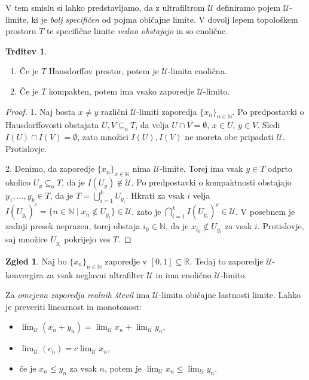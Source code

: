 \documentclass[11pt]{book}
\def\NN{\mathbb{N}}
\def\RR{\mathbb{R}}
\def\UU{\mathcal{U}}
\theoremstyle{definition}
\theoremstyle{zgled}
\newtheorem*{zgled}{Zgled}
\theoremstyle{odprtproblem}
\theoremstyle{domacanaloga}
\newenvironment{dokaz}
    {\color{siva}\begin{proof}}
    {\end{proof}}
\theoremstyle{izrek}
\newtheorem*{trditev}{Trditev}
\begin{document}
V tem smislu si lahko predstavljamo, da z ultrafiltrom $\UU$ definiramo pojem $\UU$-limite, ki je {\em bolj specifičen} od pojma običajne limite. V dovolj lepem topološkem prostoru $T$ te specifične limite {\em vedno obstajajo} in so enolične.

\begin{trditev}
\vspace{-0.5\baselineskip}
\begin{enumerate}[noitemsep]
\item Če je $T$ Hausdorffov prostor, potem je $\UU$-limita enolična.
\item Če je $T$ kompakten, potem ima vsako zaporedje $\UU$-limito. \vspace{-\baselineskip}
\end{enumerate}
\end{trditev}

\begin{dokaz}
1. Naj bosta $x \neq y$ različni $\UU$-limiti zaporedja $\{ x_n \}_{n \in \NN}$. Po predpostavki o Hausdorffovosti obstajata $U,V \subseteq_o T$, da velja $U \cap V = \emptyset$, $x \in U$, $y \in V$. Sledi $I(U) \cap I(V) = \emptyset$, zato  množici $I(U), I(V)$ ne moreta obe pripadati $\UU$. Protislovje.

2. Denimo, da zaporedje $\{ x_n \}_{x \in \NN}$ nima $\UU$-limite. Torej ima vsak $y \in T$ odprto okolico $U_y \subseteq_o T$, da je $I(U_y) \notin \UU$. Po predpostavki o kompaktnosti obstajajo $y_1, \dots, y_k \in T$, da je $T = \bigcup_{i = 1}^k U_{y_i}$. Hkrati za vsak $i$ velja $I(U_{y_i})^c = \{ n \in \NN \mid x_n \notin U_{y_i} \} \in \UU$, zato je $\bigcap_{i = 1}^k I(U_{y_i})^c \in \UU$. V posebnem je zadnji presek neprazen, torej obstaja $i_0 \in \NN$, da je $x_{i_0} \notin U_{y_i}$ za vsak $i$. Protislovje, saj množice $U_{y_i}$ pokrijejo ves $T$.
\end{dokaz}

\begin{zgled}
Naj bo $\{ x_n \}_{n \in \NN}$ zaporedje v $[0,1] \subseteq \RR$. Tedaj to zaporedje $\UU$-konvergira za vsak neglavni ultrafilter $\UU$ in ima enolično $\UU$-limito.
\end{zgled}

Za {\em omejena zaporedja realnih števil} ima $\UU$-limita običajne lastnosti limite. Lahko je preveriti linearnost in monotonost:
\begin{itemize}
    \item $\lim_\UU (x_n + y_n) = \lim_\UU x_n + \lim_\UU y_n$,
    \item $\lim_\UU (c_n) = c \lim_\UU x_n$,
    \item če je $x_n \leq y_n$ za vsak $n$, potem je $\lim_\UU x_n \leq \lim_\UU y_n$.
\end{itemize}
\end{document}
